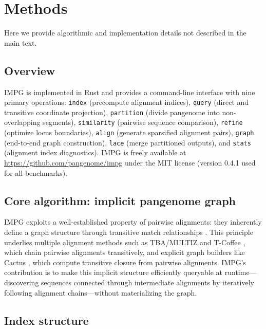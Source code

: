 
\section*{Methods}
\label{secMethods}

\setcounter{figure}{0}

Here we provide algorithmic and implementation details not described in the main text.

\subsection*{Overview}

IMPG is implemented in Rust and provides a command-line interface with nine primary operations: \texttt{index} (precompute alignment indices), \texttt{query} (direct and transitive coordinate projection), \texttt{partition} (divide pangenome into non-overlapping segments), \texttt{similarity} (pairwise sequence comparison), \texttt{refine} (optimize locus boundaries), \texttt{align} (generate sparsified alignment pairs), \texttt{graph} (end-to-end graph construction), \texttt{lace} (merge partitioned outputs), and \texttt{stats} (alignment index diagnostics). IMPG is freely available at \url{https://github.com/pangenome/impg} under the MIT license (version 0.4.1 used for all benchmarks).

\subsection*{Core algorithm: implicit pangenome graph}

IMPG exploits a well-established property of pairwise alignments: they inherently define a graph structure through transitive match relationships \cite{Garrison2024, garrison2023seqwish}. This principle underlies multiple alignment methods such as TBA/MULTIZ \cite{Blanchette2004} and T-Coffee , which chain pairwise alignments transitively, and explicit graph builders like Cactus \cite{Paten2011cactus}, which compute transitive closure from pairwise alignments. IMPG's contribution is to make this implicit structure efficiently queryable at runtime---discovering sequences connected through intermediate alignments by iteratively following alignment chains---without materializing the graph.

\subsection*{Index structure}


